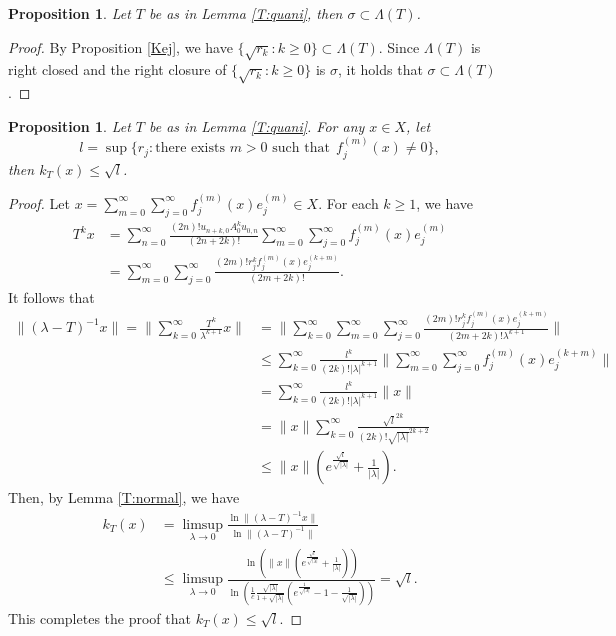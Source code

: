 \documentclass[12pt]{amsart}
\numberwithin{equation}{section}
\theoremstyle{plain}
\newtheorem{prop}[thm]{Proposition}
\theoremstyle{definition}
\begin{document}
\begin{prop}\label{R:lsubset}
Let $T$ be as in Lemma \ref{T:quani},
then $\sigma\subset \Lambda(T)$.
\end{prop}

\begin{proof}
By Proposition \ref{Kej}, we have $\{\sqrt {r_k}:k\geq 0\}\subset \Lambda(T)$.
Since $\Lambda(T)$ is right closed and the right closure of $\{\sqrt{r_k}: k\geq 0\}$ is $\sigma$, it holds that $\sigma\subset \Lambda(T)$.
\end{proof}


\begin{prop}\label{T:subsetl}
Let $T$ be as in Lemma \ref{T:quani}.
For any $x\in X$, let
$$l=\sup\{r_j: \text{there exists $m>0$ such that} ~~ f_{j}^{(m)}(x)\neq 0\},$$
then $k_{T}(x)\leq\sqrt{l}$.
\end{prop}
\begin{proof}
Let $x=\sum_{m=0}^{\infty}\sum_{j=0}^{\infty}f_{j}^{(m)}(x)e_j^{(m)}\in X$.
For each $k\geq 1$, we have
\begin{align*}
T^kx&=\sum_{n=0}^{\infty}\frac{(2n)!u_{n+k,0}A_0^ku_{0,n}}{(2n+2k)!}
\sum\limits_{m=0}^{\infty}\sum\limits_{j=0}^{\infty}f_{j}^{(m)}(x)e_j^{(m)}\\
&=\sum\limits_{m=0}^{\infty}\sum\limits_{j=0}^{\infty}\frac{(2m)!r_j^kf_{j}^{(m)}(x)e_j^{(k+m)}}{(2m+2k)!}.
\end{align*}
It follows that
\begin{align*}
\|(\lambda-T)^{-1}x\|=\|\sum_{k=0}^{\infty}\frac{T^k}{\lambda^{k+1}}x\|
&=\|\sum_{k=0}^{\infty}\sum\limits_{m=0}^{\infty}\sum\limits_{j=0}^{\infty}\frac{(2m)!r_j^kf_{j}^{(m)}(x)e_j^{(k+m)}}{(2m+2k)!\lambda^{k+1}}\|\\
&\leq
\sum_{k=0}^{\infty}\frac{l^k}{(2k)!|\lambda|^{k+1}}
\|\sum\limits_{m=0}^{\infty}\sum\limits_{j=0}^{\infty}f_{j}^{(m)}(x)e_j^{(k+m)}\|\\
&=
\sum_{k=0}^{\infty}\frac{l^k}{(2k)!|\lambda|^{k+1}}\|x\|\\
&=
\|x\|\sum_{k=0}^{\infty}\frac{\sqrt{l}^{2k}}{(2k)!\sqrt{|\lambda|}^{2k+2}}\\
&\leq \|x\|\left(e^{\frac{\sqrt{l}}{\sqrt{|\lambda|}}}+\frac{1}{|\lambda|}\right).
\end{align*}
Then, by Lemma \ref{T:normal}, we have
\begin{align*}
k_{T}(x)&=\limsup_{\lambda\rightarrow 0}
\frac{\ln\|(\lambda-T)^{-1}x\|}{\ln\|(\lambda-T)^{-1}\|}\\
&\leq
\limsup_{\lambda\rightarrow 0}
\frac{\ln\left(\|x\|\left(e^{\frac{\sqrt{l}}{\sqrt{|\lambda|}}}+\frac{1}{|\lambda|}\right)\right)}
{\ln\left(\frac{1}{c}\frac{\sqrt{|\lambda|}}{1+\sqrt{|\lambda|}}\left(e^{\frac{1}{\sqrt{|\lambda|}}}-1-\frac{1}{\sqrt{|\lambda|}}\right)\right)}=\sqrt{l}.
\end{align*}
This completes the proof that $k_T(x) \leq \sqrt{l}$.
\end{proof}
\end{document}
